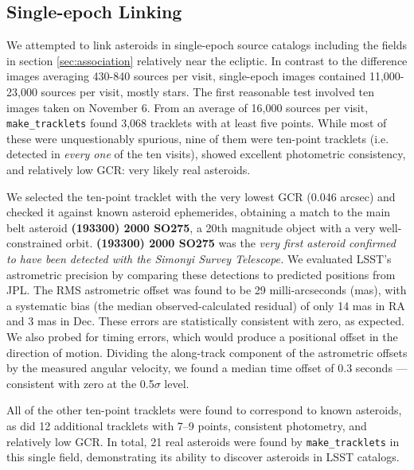 \subsection{Single-epoch Linking}
\label{sec:linking}

We attempted to link asteroids in single-epoch source catalogs including the fields in section \ref{sec:association} relatively near the ecliptic. In contrast to the difference images averaging 430-840 sources per visit, single-epoch images contained 11,000-23,000 sources per visit, mostly stars. The first reasonable test involved ten images taken on November 6. From an average of 16,000 sources per visit, {\tt make\_tracklets} found 3,068 tracklets with at least five points. While most of these were unquestionably spurious, nine of them were ten-point tracklets (i.e. detected in {\em every one} of the ten visits), showed excellent photometric consistency, and relatively low GCR: very likely real asteroids.

We selected the ten-point tracklet with the very lowest GCR (0.046 arcsec) and checked it against known asteroid ephemerides, obtaining a match to the main belt asteroid \textbf{(193300) 2000 SO275}, a 20th magnitude object with a very well-constrained orbit. \textbf{(193300) 2000 SO275} was the {\em very first asteroid confirmed to have been detected with the Simonyi Survey Telescope.} We evaluated LSST's astrometric precision by comparing these detections to predicted positions from JPL. The RMS astrometric offset was found to be 29 milli-arcseconds (mas), with a systematic bias (the median observed-calculated residual) of only 14 mas in RA and 3 mas in Dec. These errors are statistically consistent with zero, as expected. We also probed for timing errors, which would produce a positional offset in the direction of motion. Dividing the along-track component of the astrometric offsets by the measured angular velocity, we found a median time offset of 0.3 seconds --- consistent with zero at the 0.5$\sigma$ level.

All of the other ten-point tracklets were found to correspond to known asteroids, as did 12 additional tracklets with 7--9 points, consistent photometry, and relatively low GCR. In total, 21 real asteroids were found by {\tt make\_tracklets} in this single field, demonstrating its ability to discover asteroids in LSST catalogs.
